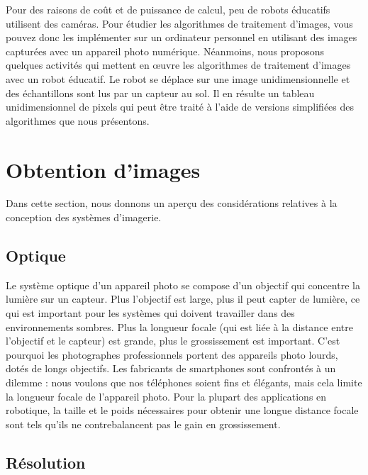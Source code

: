 Pour des raisons de coût et de puissance de calcul, peu de robots éducatifs utilisent des caméras. Pour étudier les algorithmes de traitement d'images, vous pouvez donc les implémenter sur un ordinateur personnel en utilisant des images capturées avec un appareil photo numérique. Néanmoins, nous proposons quelques activités qui mettent en œuvre les algorithmes de traitement d’images avec un robot éducatif. Le robot se déplace sur une image unidimensionnelle et des échantillons sont lus par un capteur au sol. Il en résulte un tableau unidimensionnel de pixels qui peut être traité à l'aide de versions simplifiées des algorithmes que nous présentons.

\section{Obtention d'images}\label{s.obtaining-images}

Dans cette section, nous donnons un aperçu des considérations relatives à la conception des systèmes d'imagerie.

\subsection*{Optique}
Le système optique d'un appareil photo se compose d'un objectif qui concentre la lumière sur un capteur. Plus l'objectif est large, plus il peut capter de lumière, ce qui est important pour les systèmes qui doivent travailler dans des environnements sombres. Plus la longueur focale (qui est liée à la distance entre l'objectif et le capteur) est grande, plus le grossissement est important. C'est pourquoi les photographes professionnels portent des appareils photo lourds, dotés de longs objectifs. Les fabricants de smartphones sont confrontés à un dilemme : nous voulons que nos téléphones soient fins et élégants, mais cela limite la longueur focale de l'appareil photo. Pour la plupart des applications en robotique, la taille et le poids nécessaires pour obtenir une longue distance focale sont tels qu’ils ne contrebalancent pas le gain en grossissement.

\subsection*{Résolution}

